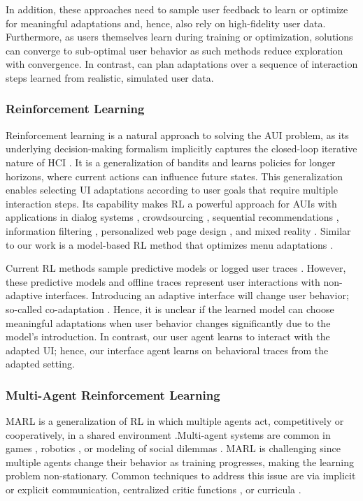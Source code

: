 In addition, these approaches need to sample user feedback to learn or optimize for meaningful adaptations and, hence, also rely on high-fidelity user data.
Furthermore, as users themselves learn during training or optimization, solutions can converge to sub-optimal user behavior as such methods reduce exploration with convergence.
In contrast, \marlui can plan adaptations over a sequence of interaction steps learned from realistic, simulated user data.

\subsubsection{Reinforcement Learning}
Reinforcement learning is a natural approach to solving the AUI problem, as its underlying decision-making formalism implicitly captures the closed-loop iterative nature of HCI \cite{howes2018interaction}. It is a generalization of bandits and learns policies for longer horizons, where current actions can influence future states. This generalization enables selecting UI adaptations according to user goals that require multiple interaction steps. Its capability makes RL a powerful approach for AUIs with applications in dialog systems \cite{Gasic2014, Su2017}, crowdsourcing \cite{PengCrowdsourcing2013, Hu2018}, sequential recommendations \cite{Chen2019, Liu2018, Liebman2015}, information filtering \cite{seo2000reinforcement}, personalized web page design \cite{ferretti2014exploiting}, and mixed reality \cite{gebhardt2019learning}. Similar to our work is a model-based RL method that optimizes menu adaptations \cite{todi2021adapting}.

Current RL methods sample predictive models \cite{todi2021adapting, Gasic2014, Hu2018} or logged user traces \cite{gebhardt2019learning}. However, these predictive models and offline traces represent user interactions with non-adaptive interfaces. Introducing an adaptive interface will change user behavior; so-called co-adaptation \cite{mackay2000responding}. Hence, it is unclear if the learned model can choose meaningful adaptations when user behavior changes significantly due to the model's introduction. In contrast, our user agent learns to interact with the adapted UI; hence, our interface agent learns on behavioral traces from the adapted setting.

\subsubsection{Multi-Agent Reinforcement Learning}
MARL is a generalization of RL in which multiple agents act, competitively or cooperatively, in a shared environment \cite{zhang2021multi}.Multi-agent systems are common in games \cite{baker2019emergent, jaderberg2019quake}, robotics \cite{ota2006multiagent,sariff2018multiagent}, or modeling of social dilemmas \cite{chao2015social,leibo2017multi}. MARL is challenging since multiple agents change their behavior as training progresses, making the learning problem non-stationary. Common techniques to address this issue are via implicit \cite{tian2020implicit} or explicit \cite{foerster2016learning} communication, centralized critic functions \cite{lowe2017multi}, or curricula \cite{epciclr2020,wang2020curriculum}.
